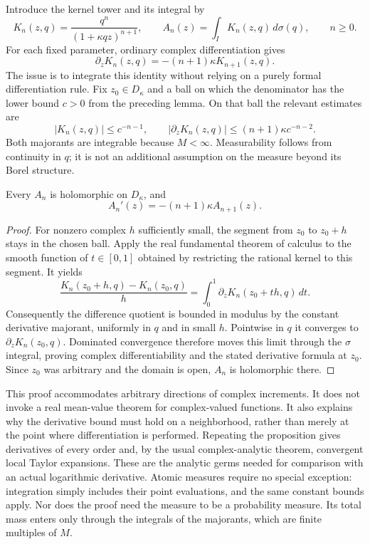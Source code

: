 \label{res:differentiation}
Introduce the kernel tower and its integral by
\[
 K_n(z,q)=\frac{q^n}{(1+\kappa qz)^{n+1}},
 \qquad A_n(z)=\int_I K_n(z,q)\,d\sigma(q),\qquad n\ge0.
\]
For each fixed parameter, ordinary complex differentiation gives
\[
 \partial_zK_n(z,q)=-(n+1)\kappa K_{n+1}(z,q).
\]
The issue is to integrate this identity without relying on a purely
formal differentiation rule. Fix $z_0\in D_\kappa$ and a ball on which
the denominator has the lower bound $c>0$ from the preceding lemma.
On that ball the relevant estimates are
\[
 |K_n(z,q)|\le c^{-n-1},\qquad
 |\partial_zK_n(z,q)|\le(n+1)\kappa c^{-n-2}.
\]
Both majorants are integrable because $M<\infty$. Measurability follows
from continuity in $q$; it is not an additional assumption on the
measure beyond its Borel structure.

\begin{proposition}
Every $A_n$ is holomorphic on $D_\kappa$, and
\[
 A_n'(z)=-(n+1)\kappa A_{n+1}(z).
\]
\end{proposition}
\begin{proof}
For nonzero complex $h$ sufficiently small, the segment from $z_0$ to
$z_0+h$ stays in the chosen ball. Apply the real fundamental theorem of
calculus to the smooth function of $t\in[0,1]$ obtained by restricting
the rational kernel to this segment. It yields
\[
 \frac{K_n(z_0+h,q)-K_n(z_0,q)}h
 =\int_0^1\partial_zK_n(z_0+th,q)\,dt.
\]
Consequently the difference quotient is bounded in modulus by the
constant derivative majorant, uniformly in $q$ and in small $h$.
Pointwise in $q$ it converges to $\partial_zK_n(z_0,q)$. Dominated
convergence therefore moves this limit through the $\sigma$ integral,
proving complex differentiability and the stated derivative formula at
$z_0$. Since $z_0$ was arbitrary and the domain is open, $A_n$ is
holomorphic there.
\end{proof}

This proof accommodates arbitrary directions of complex increments.
It does not invoke a real mean-value theorem for complex-valued
functions. It also explains why the derivative bound must hold on a
neighborhood, rather than merely at the point where differentiation is
performed. Repeating the proposition gives derivatives of every order
and, by the usual complex-analytic theorem, convergent local Taylor
expansions. These are the analytic germs needed for comparison with
an actual logarithmic derivative.
Atomic measures require no special exception: integration simply
includes their point evaluations, and the same constant bounds apply.
Nor does the proof need the measure to be a probability measure.
Its total mass enters only through the integrals of the majorants,
which are finite multiples of $M$.

